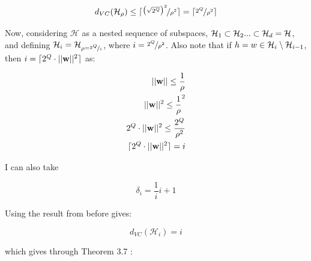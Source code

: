 \documentclass{scrartcl}
\begin{document}
\[ d_{VC} (\mathcal{H}_\rho) \leq \lceil \nicefrac { \big( \sqrt{ 2^Q } \big) ^2 } { \rho^2 } \rceil = \lceil \nicefrac{2^Q} {\rho^2} \rceil \]

Now, considering $\mathcal{H}$ as a nested sequence of subspaces, ${\mathcal{H}}_1 \subset {\mathcal{H}}_2 ... \subset {\mathcal{H}}_d = {\mathcal{H}}$, and defining ${\mathcal{H}}_i = {\mathcal{H}}_{\rho = \nicefrac {2^Q} {i}}$, where $i = \nicefrac {2^Q} {\rho^2}$. Also note that if $h = w \in {\mathcal{H}}_i \setminus {\mathcal{H}}_{i-1}$,
then $i = \lceil 2^Q \cdot || {\mathbf w} ||^2 \rceil $ as:

\begin{align*}
    || {\mathbf w} || \leq \frac {1} {\rho} \\
    || {\mathbf w} ||^2 \leq \frac {1} {\rho}^2 \\
    2^Q \cdot || {\mathbf w} ||^2 \leq \frac {2^Q} {\rho^2} \\
    \lceil 2^Q \cdot || {\mathbf w} ||^2 \rceil = i \\
\end{align*}

I can also take

\[
    \delta_i = \frac {1} {i}{i+1}
\]

Using the result from before gives:

\[ d_{VC} (\mathcal{H}_i) = i\]

which gives through Theorem 3.7 \cite[p.18]{mln}:
\end{document}
